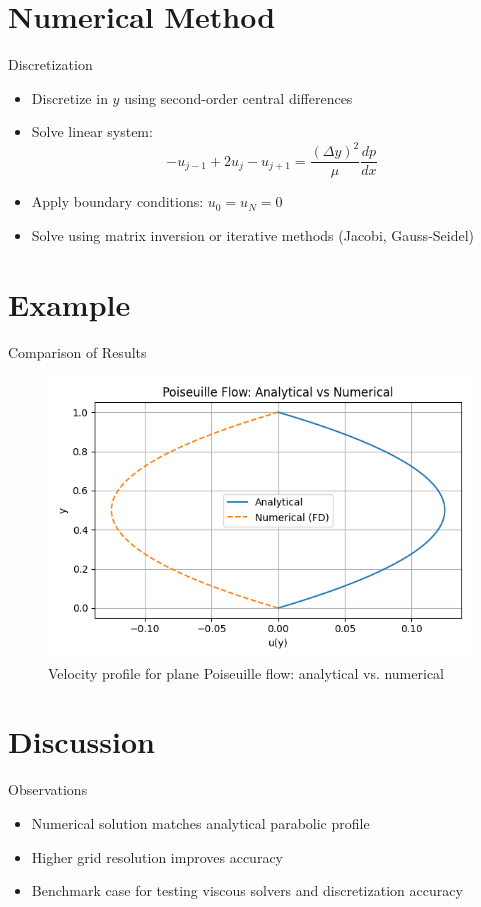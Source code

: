 \documentclass{beamer}
\begin{document}
\section{Numerical Method}
\begin{frame}{Discretization}
\begin{itemize}
    \item Discretize in $y$ using second-order central differences
    \item Solve linear system:
    \[
    -u_{j-1} + 2u_j - u_{j+1} = \frac{(\Delta y)^2}{\mu} \frac{dp}{dx}
    \]
    \item Apply boundary conditions: \( u_0 = u_N = 0 \)
    \item Solve using matrix inversion or iterative methods (Jacobi, Gauss-Seidel)
\end{itemize}
\end{frame}

\section{Example}
\begin{frame}{Comparison of Results}
\begin{figure}[h]
\centering
\includegraphics[width=0.8\linewidth]{poiseuille_plot.png} %
\caption{Velocity profile for plane Poiseuille flow: analytical vs. numerical}
\end{figure}
\end{frame}

\section{Discussion}
\begin{frame}{Observations}
\begin{itemize}
    \item Numerical solution matches analytical parabolic profile
    \item Higher grid resolution improves accuracy
    \item Benchmark case for testing viscous solvers and discretization accuracy
\end{itemize}
\end{frame}
\end{document}
